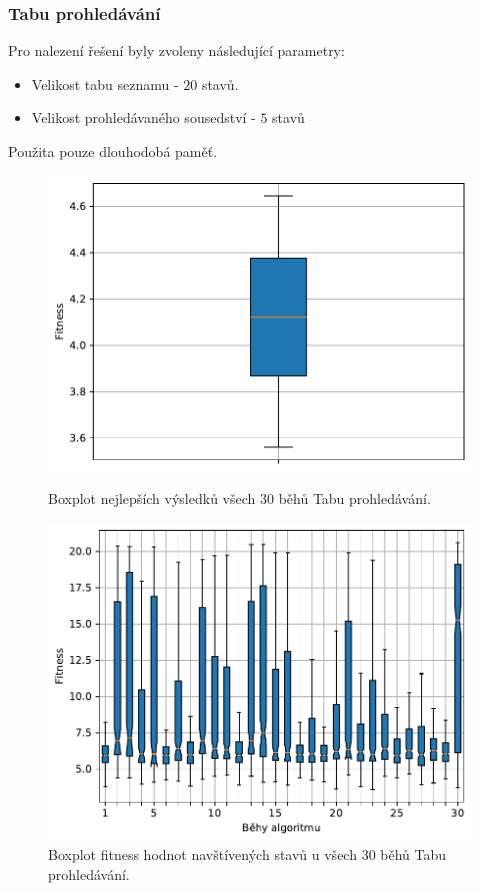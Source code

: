 \subsubsection{Tabu prohledávání}
Pro nalezení řešení byly zvoleny následující parametry:
\begin{itemize}
    \item Velikost tabu seznamu - $20$ stavů.
    \item Velikost prohledávaného sousedství - $5$ stavů
\end{itemize}
Použita pouze dlouhodobá paměť.

\begin{figure}[H]
\begin{minipage}[t]{0.475\linewidth}
\includegraphics[width=\linewidth]{obrazky-figures/statistics/Benchmarks/Ackley/TABU/bestsBoxplot_WithOutliers.pdf}
\caption{Boxplot nejlepších výsledků všech $30$ běhů Tabu prohledávání.}
\label{fg:bench:ackley:ts:best}
\end{minipage}
\hfill
\begin{minipage}[t]{0.475\linewidth}
\includegraphics[width=\linewidth]{obrazky-figures/statistics/Benchmarks/Ackley/TABU/lastGenBoxplots.pdf}
\caption{Boxplot fitness hodnot navštívených stavů u všech $30$ běhů Tabu prohledávání.}
\label{fg:bench:ackley:ts:lastGen}
\end{minipage}
\end{figure}

